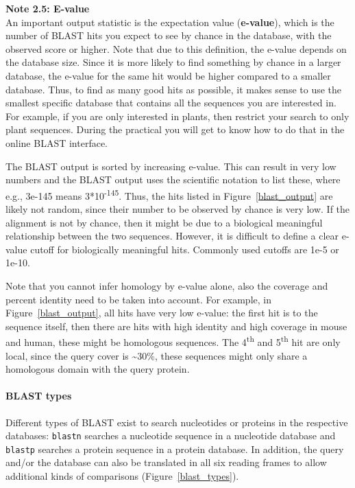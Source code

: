 \begin{framed}
\textbf{Note 2.5: E-value}\\
An important output statistic is the expectation value (\textbf{e-value}), which is the number of BLAST hits you expect to see by chance in the database, with the observed score or higher.
Note that due to this definition, the e-value depends on the database size.
Since it is more likely to find something by chance in a larger database, the e-value for the same hit would be higher compared to a smaller database.
Thus, to find as many good hits as possible, it makes sense to use the smallest specific database that contains all the sequences you are interested in.
For example, if you are only interested in plants, then restrict your search to only plant sequences.
During the practical you will get to know how to do that in the online BLAST interface.

The BLAST output is sorted by increasing e-value.
This can result in very low numbers and the BLAST output uses the scientific notation to list these, where e.g., 3e-145 means 3*10\textsuperscript{-145}.
Thus, the hits listed in Figure~\ref{blast_output} are likely not random, since their number to be observed by chance is very low.
If the alignment is not by chance, then it might be due to a biological meaningful relationship between the two sequences.
However, it is difficult to define a clear e-value cutoff for biologically meaningful hits.
Commonly used cutoffs are 1e-5 or 1e-10.
\end{framed}

Note that you cannot infer homology by e-value alone, also the coverage and percent identity need to be taken into account.
For example, in Figure~\ref{blast_output}, all hits have very low e-value:
the first hit is to the sequence itself, then there are hits with high identity and high coverage in mouse and human, these might be homologous sequences.
The 4\textsuperscript{th} and 5\textsuperscript{th} hit are only local, since the query cover is {\textasciitilde}30\%, these sequences might only share a homologous domain with the query protein.

\paragraph{BLAST types}

Different types of BLAST exist to search nucleotides or proteins in the respective databases:
\texttt{blastn} searches a nucleotide sequence in a nucleotide database and \texttt{blastp} searches a protein sequence in a protein database.
In addition, the query and/or the database can also be translated in all six reading frames to allow additional kinds of comparisons (Figure~\ref{blast_types}).

